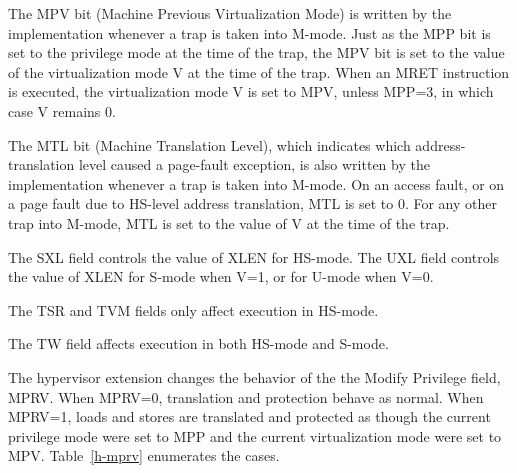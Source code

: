The MPV bit (Machine Previous Virtualization Mode) is written by the implementation
whenever a trap is taken into M-mode.  Just as the MPP bit is set to the privilege
mode at the time of the trap, the MPV bit is set to the value of the virtualization
mode V at the time of the trap.  When an MRET instruction is executed, the
virtualization mode V is set to MPV, unless MPP=3, in which case V remains 0.

The MTL bit (Machine Translation Level), which indicates which address-translation level
caused a page-fault exception, is also written by the implementation whenever a trap
is taken into M-mode.  On an access fault, or on a page fault due to HS-level address
translation, MTL is set to 0.  For any other trap into M-mode, MTL is set to the value
of V at the time of the trap.

The SXL field controls the value of XLEN for HS-mode.
The UXL field controls the value of XLEN for S-mode when V=1, or for U-mode when V=0.

The TSR and TVM fields only affect execution in HS-mode.

The TW field affects execution in both HS-mode and S-mode.

The hypervisor extension changes the behavior of the the Modify Privilege
field, MPRV.  When MPRV=0, translation and protection behave as normal.  When
MPRV=1, loads and stores are translated and protected as though the current
privilege mode were set to MPP and the current virtualization mode were set to
MPV.  Table~\ref{h-mprv} enumerates the cases.

